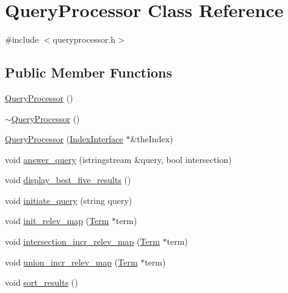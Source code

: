 \hypertarget{class_query_processor}{}\section{Query\+Processor Class Reference}
\label{class_query_processor}


{\ttfamily \#include $<$queryprocessor.\+h$>$}

\subsection*{Public Member Functions}
\begin{DoxyCompactItemize}
\item 
\hyperlink{class_query_processor_a32a6760ff0aab51b38fb8eb236e2e140}{Query\+Processor} ()
\item 
\hyperlink{class_query_processor_ac4bebae67b0c08004f26f55957428574}{$\sim$\+Query\+Processor} ()
\item 
\hyperlink{class_query_processor_a26a6c6dae98c83f91d66d85bf768448a}{Query\+Processor} (\hyperlink{class_index_interface}{Index\+Interface} $\ast$\&the\+Index)
\item 
void \hyperlink{class_query_processor_a95136769b295bc5a56d83a476260ed60}{answer\+\_\+query} (istringstream \&query, bool intersection)
\item 
void \hyperlink{class_query_processor_ab84ed5b136aaeb24018a4eb013da3452}{display\+\_\+best\+\_\+five\+\_\+results} ()
\item 
void \hyperlink{class_query_processor_ae59525962d93a0087fee0afd689ce1e3}{initiate\+\_\+query} (string query)
\item 
void \hyperlink{class_query_processor_ae1f3fdd94b58ac3016ab04873145fec7}{init\+\_\+relev\+\_\+map} (\hyperlink{class_term}{Term} $\ast$term)
\item 
void \hyperlink{class_query_processor_a29d1767fe229ea175488976673463dcb}{intersection\+\_\+incr\+\_\+relev\+\_\+map} (\hyperlink{class_term}{Term} $\ast$term)
\item 
void \hyperlink{class_query_processor_aa00880b1308428b29cdc32741f82f4fc}{union\+\_\+incr\+\_\+relev\+\_\+map} (\hyperlink{class_term}{Term} $\ast$term)
\item 
void \hyperlink{class_query_processor_abb0fce31c633a5c0ae571f144f8f36f7}{sort\+\_\+results} ()
\end{DoxyCompactItemize}
